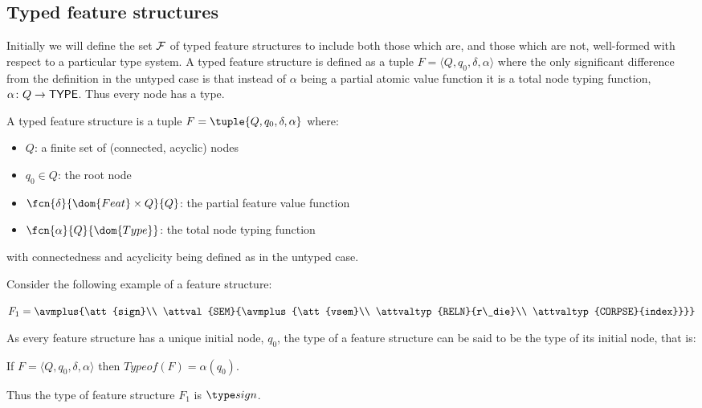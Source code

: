 \documentclass[12pt]{report}
\begin{document}
\subsection{Typed feature structures}
\label{formtfs}

Initially we will 
define the set $\cal F$ of typed feature structures to include 
both those which are, and those which are not, well-formed with respect
to a particular type system.
A typed feature structure is defined as a tuple 
$F = \langle Q, q_{0}, \delta, \alpha \rangle$ 
where the only significant difference from the definition in the
untyped case 
is that instead of $\alpha$ being a partial atomic value function it is
a total node typing function, $\alpha\colon Q \rightarrow {\sf TYPE}$.  
Thus every node has a type.
\begin{definition}
A typed feature structure is a tuple $F =
\tuple{Q,q_{0},\delta,\alpha}$ where:
\begin{itemize}
\item
$Q$:  a finite set of (connected, acyclic) nodes 
\item
$q_{0} \in Q$: the root node
\item
$\fcn{\delta}{\dom{Feat} \times Q}{Q}$:  
the partial feature value function
\item
$\fcn{\alpha}{Q}{\dom{Type}}$: the total node typing function
\end{itemize}
with connectedness and acyclicity being defined as in the
untyped case.
\end{definition}

Consider the following example of a feature structure:
\begin{center}
{\tiny
   $F_{1}=\avmplus{\att{sign}\\
             \attval{SEM}{\avmplus{\att{vsem}\\
                                   \attvaltyp{RELN}{r\_die}\\
                                   \attvaltyp{CORPSE}{index}}}}$}
\end{center}
As every feature structure has a unique initial node, $q_{0}$, the
type of a feature structure can be said to be
the type of its initial node, that is: 
\begin{definition}
If $F = \langle Q, q_{0}, \delta, \alpha \rangle$ 
then $Typeof(F) = \alpha(q_{0})$. 
\end{definition}
Thus the type of feature structure $F_{1}$ is $\type sign$.  
\end{document}

